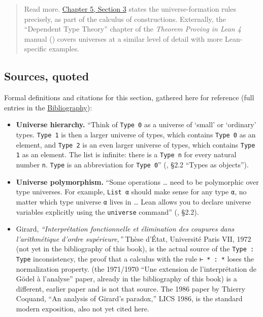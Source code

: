 \begin{quote}
Read more. \hyperref[sec:05-rigor-check:03-typing-rules-and-safety:1]{Chapter 5, Section 3} states the universe-formation rules precisely, as part of the calculus of constructions. Externally, the ``Dependent Type Theory'' chapter of the \emph{Theorem Proving in Lean 4} manual (\cite{TPIL4}) covers universes at a similar level of detail with more Lean-specific examples.
\end{quote}

\subsection{Sources, quoted}\label{sec:05-rigor-check:02-universes:5}

Formal definitions and citations for this section, gathered here for reference (full entries in the \hyperref[sec:root:bibliography:1]{Bibliography}):

\begin{itemize}
\tightlist
\item
  \textbf{Universe hierarchy.} ``Think of \texttt{Type 0} as a universe of `small' or `ordinary' types. \texttt{Type 1} is then a larger universe of types, which contains \texttt{Type 0} as an element, and \texttt{Type 2} is an even larger universe of types, which contains \texttt{Type 1} as an element. The list is infinite: there is a \texttt{Type n} for every natural number \texttt{n}. \texttt{Type} is an abbreviation for \texttt{Type 0}'' (\cite{TPIL4}, §2.2 ``Types as objects'').
\item
  \textbf{Universe polymorphism.} ``Some operations \ldots{} need to be polymorphic over type universes. For example, \texttt{List α} should make sense for any type \texttt{α}, no matter which type universe \texttt{α} lives in \ldots{} Lean allows you to declare universe variables explicitly using the \texttt{universe} command'' (\cite{TPIL4}, §2.2).
\item
  Girard, \emph{``Interprétation fonctionnelle et élimination des coupures dans l'arithmétique d'ordre supérieure,''} Thèse d'État, Université Paris VII, 1972 (not yet in the bibliography of this book), is the actual source of the \texttt{Type : Type} inconsistency, the proof that a calculus with the rule \texttt{⊢ * : *} loses the normalization property. \cite{Girard1971} (the 1971/1970 ``Une extension de l'interprétation de Gödel à l'analyse'' paper, already in the bibliography of this book) is a different, earlier paper and is not that source. The 1986 paper by Thierry Coquand, ``An analysis of Girard's paradox,'' LICS 1986, is the standard modern exposition, also not yet cited here.
\end{itemize}
